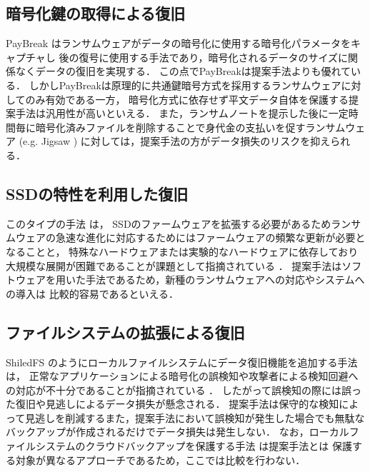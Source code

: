 \subsection{暗号化鍵の取得による復旧}
PayBreak \cite{kolodenker2017paybreak}はランサムウェアがデータの暗号化に使用する暗号化パラメータをキャプチャし
後の復号に使用する手法であり，暗号化されるデータのサイズに関係なくデータの復旧を実現する．
この点でPayBreakは提案手法よりも優れている．
しかしPayBreakは原理的に共通鍵暗号方式を採用するランサムウェアに対してのみ有効である一方，
暗号化方式に依存せず平文データ自体を保護する提案手法は汎用性が高いといえる．
また，ランサムノートを提示した後に一定時間毎に暗号化済みファイルを削除することで身代金の支払いを促すランサムウェア (e.g. Jigsaw \cite{byrne2017jigsaw})
に対しては，提案手法の方がデータ損失のリスクを抑えられる．

\subsection{SSDの特性を利用した復旧}
このタイプの手法 \cite{huang2017flashguard,baek2018ssd} は，
SSDのファームウェアを拡張する必要があるためランサムウェアの急速な進化に対応するためにはファームウェアの頻繁な更新が必要となることと，
特殊なハードウェアまたは実験的なハードウェアに依存しており大規模な展開が困難であることが課題として指摘されている \cite{wang2024ransom}．
提案手法はソフトウェアを用いた手法であるため，新種のランサムウェアへの対応やシステムへの導入は
比較的容易であるといえる．

\subsection{ファイルシステムの拡張による復旧}
ShiledFS \cite{shieldFS} のようにローカルファイルシステムにデータ復旧機能を追加する手法は，
正常なアプリケーションによる暗号化の誤検知や攻撃者による検知回避への対応が不十分であることが指摘されている \cite{han2020effectiveness,css2024-enomoto}．
したがって誤検知の際には誤った復旧や見逃しによるデータ損失が懸念される．
提案手法は保守的な検知によって見逃しを削減するまた，提案手法において誤検知が発生した場合でも無駄なバックアップが作成されるだけでデータ損失は発生しない．
なお，ローカルファイルシステムのクラウドバックアップを保護する手法 \cite{matos2018rockfs} は提案手法とは
保護する対象が異なるアプローチであるため，ここでは比較を行わない．

